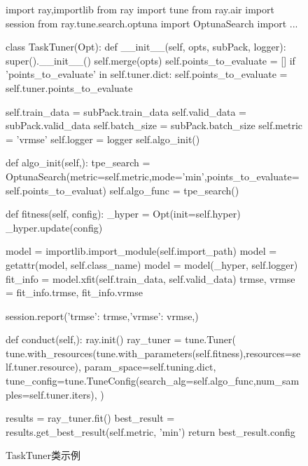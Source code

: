 \begin{figure}[t!]
    \begin{python}
import ray,importlib
from ray import tune
from ray.air import session
from ray.tune.search.optuna import OptunaSearch
import ...

class TaskTuner(Opt):
    def __init__(self, opts, subPack, logger):
        super().__init__()
        self.merge(opts) 
        self.points_to_evaluate = []
        if 'points_to_evaluate' in self.tuner.dict:
            self.points_to_evaluate = self.tuner.points_to_evaluate
        
        self.train_data = subPack.train_data
        self.valid_data = subPack.valid_data
        self.batch_size = subPack.batch_size
        self.metric = 'vrmse'
        self.logger = logger
        self.algo_init()
    
    def algo_init(self,):    
        tpe_search = OptunaSearch(metric=self.metric,mode='min',points_to_evaluate=self.points_to_evaluat)
        self.algo_func = tpe_search()

    def fitness(self, config):
        _hyper = Opt(init=self.hyper)
        _hyper.update(config) 

        model = importlib.import_module(self.import_path)
        model = getattr(model, self.class_name)
        model = model(_hyper, self.logger)
        fit_info = model.xfit(self.train_data, self.valid_data)
        trmse, vrmse = fit_info.trmse, fit_info.vrmse

        session.report({'trmse': trmse,'vrmse': vrmse,})
    
    def conduct(self,):
        ray.init()
        ray_tuner = tune.Tuner(
            tune.with_resources(tune.with_parameters(self.fitness),resources=self.tuner.resource),
            param_space=self.tuning.dict,
            tune_config=tune.TuneConfig(search_alg=self.algo_func,num_samples=self.tuner.iters),
            )
        
        results = ray_tuner.fit() 
        best_result = results.get_best_result(self.metric, 'min')
        return best_result.config
    \end{python}
    \caption{TaskTuner类示例\label{fig:ch.univ.ray}}
\end{figure}